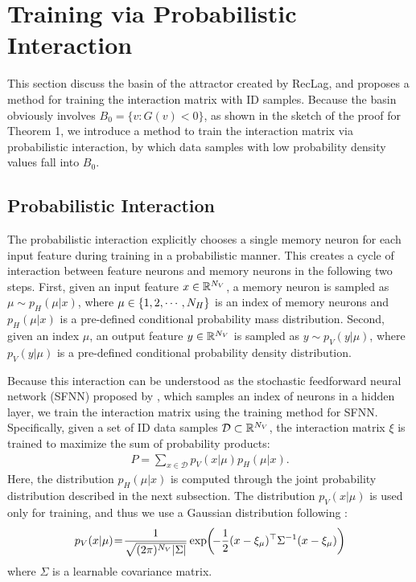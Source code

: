 \section{Training via Probabilistic Interaction}

This section discuss the basin of the attractor created by RecLag, and proposes a method for training the interaction matrix with ID samples.
Because the basin obviously involves $B_{0} = \{v: G(v) < 0\}$, as shown in the sketch of the proof for Theorem 1, we introduce a method to train the interaction matrix via probabilistic interaction, by which data samples with low probability density values fall into $B_{0}$.

\subsection{Probabilistic Interaction}
The probabilistic interaction explicitly chooses a single memory neuron for each input feature during training in a probabilistic manner.
This creates a cycle of interaction between feature neurons and memory neurons in the following two steps. First, given an input feature $x \in \mathbb{R}^{N_{V}}$,
a memory neuron is sampled as $\mu \sim p_{H}(\mu|x)$, where
$\mu \in \{1, 2, \cdots, N_{H}\}$ is an index of memory neurons and $p_{H}(\mu|x)$ is a pre-defined conditional probability mass distribution.
Second, given an index $\mu$,
an output feature $y \in \mathbb{R}^{N_{V}}$ is sampled as $y \sim p_{V}(y|\mu)$, where $p_{V}(y|\mu)$ is a pre-defined conditional probability density distribution.

Because this interaction can be understood as the stochastic feedforward neural network (SFNN) proposed by \citet{tang13sfnn}, which samples an index of neurons in a hidden layer, we train the interaction matrix using the training method for SFNN.
Specifically, given a set of ID data samples $\mathcal{D} \subset \mathbb{R}^{N_{V}}$, the interaction matrix $\xi$ is trained to maximize the sum of probability products:
\begin{align}
\label{eq:objective_sfnn}
P = \sum_{x \in \mathcal{D}} p_{V}(x|\mu) p_{H}(\mu|x).  
\end{align}
Here, the distribution $p_{H} (\mu|x)$ is computed through the joint probability distribution described in the next subsection.
The distribution $p_{V}(x|\mu)$ is used only for training, and thus we use a Gaussian distribution following \citet{tang13sfnn}:\begin{align}
p_{V}(x|\mu)
\hspace{-2pt}
=\hspace{-2pt}
\frac{1}{\sqrt{(2\pi)^{N_{V}} |\Sigma|}}
\exp
\hspace{-2pt}
\left(
\hspace{-2pt}
-\frac{1}{2} (x - \xi_{\mu})^{\top} \Sigma^{-1} (x - \xi_{\mu}) \right)
\end{align}
where $\Sigma$ is a learnable covariance matrix.

